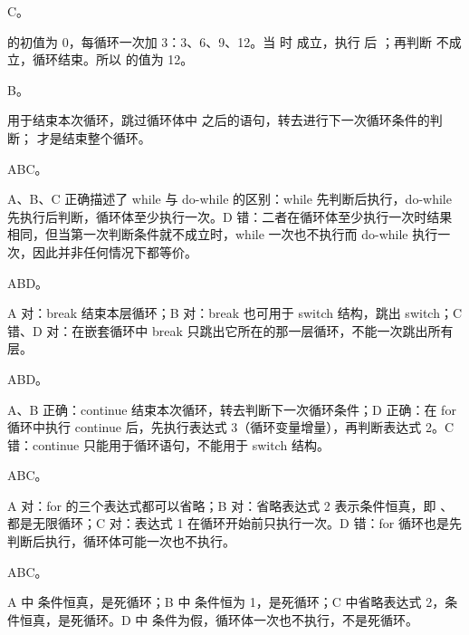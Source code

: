 \documentclass[a4paper,11pt]{article}
\begin{document}
\q C。\begin{analysis} 的初值为 0，每循环一次加 3：3、6、9、12。当  时  成立，执行  后 ；再判断  不成立，循环结束。所以  的值为 12。\end{analysis}

\q B。\begin{analysis} 用于结束本次循环，跳过循环体中  之后的语句，转去进行下一次循环条件的判断； 才是结束整个循环。\end{analysis}


\q ABC。\begin{analysis}A、B、C 正确描述了 while 与 do-while 的区别：while 先判断后执行，do-while 先执行后判断，循环体至少执行一次。D 错：二者在循环体至少执行一次时结果相同，但当第一次判断条件就不成立时，while 一次也不执行而 do-while 执行一次，因此并非任何情况下都等价。\end{analysis}

\q ABD。\begin{analysis}A 对：break 结束本层循环；B 对：break 也可用于 switch 结构，跳出 switch；C 错、D 对：在嵌套循环中 break 只跳出它所在的那一层循环，不能一次跳出所有层。\end{analysis}

\q ABD。\begin{analysis}A、B 正确：continue 结束本次循环，转去判断下一次循环条件；D 正确：在 for 循环中执行 continue 后，先执行表达式 3（循环变量增量），再判断表达式 2。C 错：continue 只能用于循环语句，不能用于 switch 结构。\end{analysis}

\q ABC。\begin{analysis}A 对：for 的三个表达式都可以省略；B 对：省略表达式 2 表示条件恒真，即 、 都是无限循环；C 对：表达式 1 在循环开始前只执行一次。D 错：for 循环也是先判断后执行，循环体可能一次也不执行。\end{analysis}

\q ABC。\begin{analysis}A 中  条件恒真，是死循环；B 中  条件恒为 1，是死循环；C 中省略表达式 2，条件恒真，是死循环。D 中  条件为假，循环体一次也不执行，不是死循环。\end{analysis}

\end{document}
